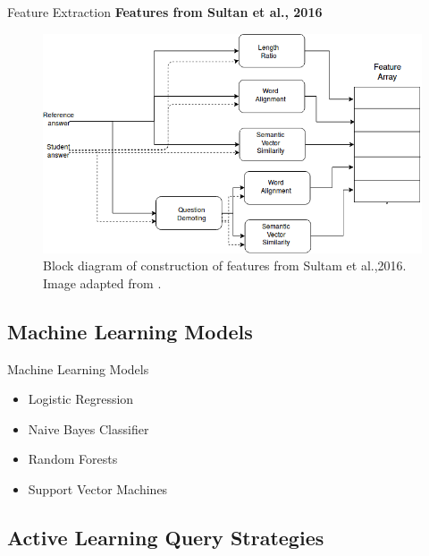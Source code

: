 \documentclass{beamer}
\begin{document}
\begin{frame}{Feature Extraction}
	\textbf{Features from Sultan et al., 2016}
	\begin{figure}[!htb]
		\centering
		\includegraphics[scale=0.40]{images/feature_array}
		\caption{ Block diagram of construction of features from Sultam et al.,2016. Image adapted from \cite{ramesh2} \cite{Sultan2016}.}
		\label{nngrades}
	\end{figure}
\end{frame}




\subsection{Machine Learning Models}

\begin{frame}{Machine Learning Models}
	\begin{itemize}
		\item Logistic Regression
		\item Naive Bayes Classifier
		\item Random Forests
		\item Support Vector Machines
	\end{itemize}
\end{frame}




\subsection{Active Learning Query Strategies}
\end{document}
